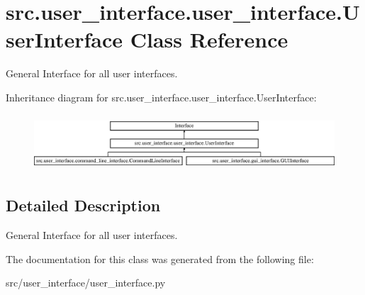 \hypertarget{classsrc_1_1user__interface_1_1user__interface_1_1_user_interface}{}\section{src.\+user\+\_\+interface.\+user\+\_\+interface.\+User\+Interface Class Reference}
\label{classsrc_1_1user__interface_1_1user__interface_1_1_user_interface}


General Interface for all user interfaces.  


Inheritance diagram for src.\+user\+\_\+interface.\+user\+\_\+interface.\+User\+Interface\+:\begin{figure}[H]
\begin{center}
\leavevmode
\includegraphics[height=2.110553cm]{classsrc_1_1user__interface_1_1user__interface_1_1_user_interface}
\end{center}
\end{figure}


\subsection{Detailed Description}
General Interface for all user interfaces. 

The documentation for this class was generated from the following file\+:\begin{DoxyCompactItemize}
\item 
src/user\+\_\+interface/user\+\_\+interface.\+py\end{DoxyCompactItemize}
